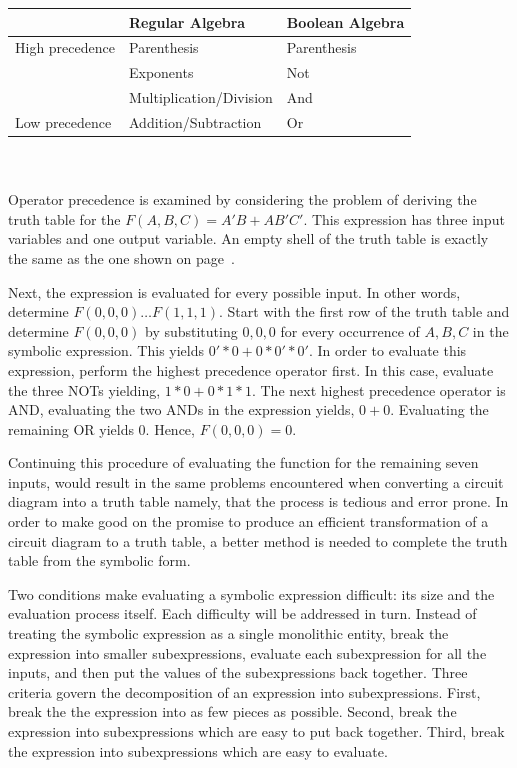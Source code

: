 \begin{tabular}[ht]{l|l|l}
			& Regular Algebra			& Boolean Algebra \\ \hline \hline
High precedence	& Parenthesis			& Parenthesis	\\ \hline
			& Exponents				& Not			\\ \hline
			& Multiplication/Division	& And			\\ \hline
Low precedence	& Addition/Subtraction 		& Or 			\\
\end{tabular}
\\ \\
Operator precedence is examined by considering the problem of
deriving the truth table for the $F(A,B,C) = A'B + AB'C'$.  This expression
has three input variables and one output variable.  An empty shell of the 
truth table is exactly the same as the one shown on 
page~\pageref{page:TTshell}.  

Next, the expression is evaluated for every possible input.  In 
other words, determine $F(0,0,0) \ldots F(1,1,1)$.  Start with 
the first row of the truth table and determine $F(0,0,0)$ by
substituting $0,0,0$ for every occurrence of $A,B,C$ in the symbolic 
expression.  This yields $0'*0+0*0'*0'$.  In order to evaluate this expression, 
perform the highest precedence operator first.  In this case, evaluate 
the three NOTs yielding, $1*0+0*1*1$.  The next highest 
precedence operator is AND, evaluating the two ANDs in the expression 
yields, $0+0$.   Evaluating the remaining OR yields 0.  Hence, $F(0,0,0)=0$.

Continuing this procedure of evaluating the function for the remaining seven
inputs, would result in the same problems encountered when converting  a
circuit diagram into a truth table namely, that the
process is tedious and error prone.  In order to make good on the 
promise to produce an efficient transformation of a circuit diagram 
to a truth table, a better method is needed to complete the truth table
from the symbolic form.

Two conditions make evaluating a symbolic expression
difficult: its size and the evaluation process itself.  Each difficulty
will be addressed in turn.  Instead of treating the symbolic expression 
as a single monolithic entity, break the expression into smaller
subexpressions, evaluate each subexpression for all the inputs, and 
then put the values of the subexpressions back together.  Three criteria govern
the decomposition of an expression into subexpressions. First, break the 
the expression into as few pieces as possible.  Second, break the expression 
into subexpressions which are easy to put back together.  Third, break the
expression into subexpressions which are easy to evaluate.  

